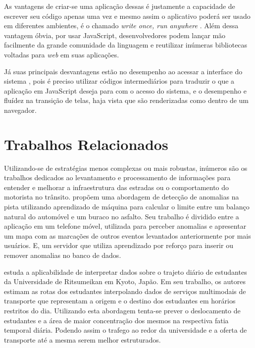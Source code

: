 \documentclass[12pt]{report} %
\begin{document}
As vantagens de criar-se uma aplicação dessas é justamente a capacidade de escrever seu código apenas uma vez e mesmo assim o aplicativo poderá ser usado em diferentes ambientes, é o chamado \textit{write once, run anywhere} \cite{Xanthopoulos:2013:CAC:2490257.2490292}. Além dessa vantagem óbvia, por usar JavaScript, desenvolvedores podem lançar mão facilmente da grande comunidade da linguagem e reutilizar inúmeras bibliotecas voltadas para \textit{web} em suas aplicações.

Já suas principais desvantagens estão no desempenho ao acessar a interface do sistema \cite{malavolta}, pois é preciso utilizar códigos intermediários para traduzir o que a aplicação em JavaScript deseja para com o acesso do sistema, e o desempenho e fluídez na transição de telas, haja vista que são renderizadas como dentro de um navegador.


\chapter{Trabalhos Relacionados}
\label{sec:trabalhos_relacionados}

Utilizando-se de estratégias menos complexas ou mais robustas, inúmeros são os trabalhos dedicados ao levantamento e processamento de informações para entender e melhorar a infraestrutura das estradas ou o comportamento do motorista no trânsito. \citep{gawad2016dynamic} propõem uma abordagem de detecção de anomalias na pista utilizando aprendizado de máquina para calcular o limite entre um balanço natural do automóvel e um buraco no asfalto. Seu trabalho é dividido entre a aplicação em um telefone móvel, utilizada para perceber anomalias e apresentar um mapa com as marcações de outros eventos levantados anteriormente por mais usuários. E, um servidor que utiliza aprendizado por reforço para inserir ou remover anomalias no banco de dados. 

\citep{HANAOKA2014274} estuda a aplicabilidade de interpretar dados sobre o trajeto diário de estudantes da Universidade de Ritsumeikan em Kyoto, Japão. Em seu trabalho, os autores estimam as rotas dos estudantes interpolando dados de serviços multimodais de transporte que representam a origem e o destino dos estudantes em horários restritos do dia. Utilizando esta abordagem tenta-se prever o deslocamento de estudantes e a área de maior concentração dos mesmos na respectiva fatia temporal diária. Podendo assim o trafego ao redor da universidade e a oferta de transporte até a mesma serem melhor estruturados.
\end{document}

